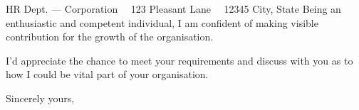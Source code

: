 \documentclass{scrlttr2}
\renewcommand{\\}{\ {\large\textperiodcentered}\ }
\begin{document}
\begin{letter}{ %
HR Dept. --- Corporation\\
123 Pleasant Lane\\
12345 City, State
}
Being an enthusiastic and competent individual, I am confident of making visible contribution for the growth of the organisation.\\

I'd appreciate the chance to meet your requirements and discuss with you as to how I could be vital part of your organisation.\\ \\ \\

Sincerely yours, \\


\end{letter}
\end{document}

